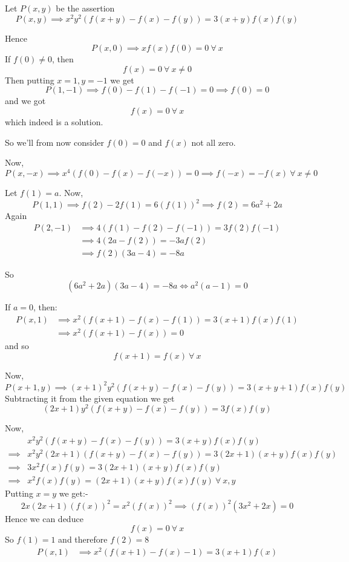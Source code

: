 \documentclass[12pt]{article}
\begin{document}
	
\Huge{Let $ P(x,y)$ be the assertion $$P(x,y)\implies x^2y^2(f(x + y)-f(x) - f(y)) = 3(x + y)f(x)f(y)$$\par
Hence$$P(x,0)\implies xf(x)f(0) = 0\ \forall\ x$$If $ f(0)\neq 0$, then $$ f(x) = 0\ \forall\ x\ne 0$$
Then putting $x=1,y=-1$ we get $$ P(1, - 1)\implies f(0)-f(1)-f(-1)=0\implies f(0) = 0$$ and we got $$ f(x) = 0\ \forall\ x$$ which indeed is a solution.\par
So we'll from now consider $ f(0) = 0$ and $ f(x)$ not all zero.\par
Now,$$ P(x, - x)\implies x^4\left( f(0)-f(x)-f(-x)\right) =0\implies f(-x)=-f(x)\ \forall\ x\ne 0$$\par
Let $ f(1) = a$. Now,$$ P(1,1) \implies f(2)-2f(1)=6\left(f(1)\right)^2\implies f(2) = 6a^2 + 2a$$
Again
\begin{align*}
P(2, - 1) & \implies 4(f(1)-f(2)-f(-1))=3f(2)f(-1)\\
&\implies 4(2a - f(2)) = - 3af(2)\\
&\implies f(2)(3a - 4) = - 8a
\end{align*}\par
So $$ (6a^2 + 2a)(3a - 4) = - 8a \iff a^2(a - 1) = 0$$\par
If $ a = 0$, then:
\begin{align*}
P(x,1) &\implies x^2(f(x + 1) - f(x)-f(1)) =3(x+1)f(x)f(1)\\
&\implies x^2(f(x+1)-f(x))=0
\end{align*}
and so $$ f(x + 1) = f(x)\ \forall\ x$$\par
Now,$$ P(x + 1,y) \implies (x + 1)^2y^2(f(x + y) - f(x) - f(y)) = 3(x + y + 1)f(x)f(y)$$
Subtracting it from the given equation we get$$(2x + 1)y^2(f(x + y) - f(x) - f(y)) = 3f(x)f(y)$$\par
Now,\begin{align*}
& x^2y^2(f(x + y)-f(x) - f(y)) = 3(x + y)f(x)f(y)\\
\implies & x^2y^2(2x+1)(f(x + y)-f(x) - f(y))=3(2x+1)(x + y)f(x)f(y)\\
\implies & 3x^2f(x)f(y)=3(2x+1)(x+y)f(x)f(y)\\
\implies & x^2f(x)f(y)=(2x+1)(x+y)f(x)f(y)\ \forall\ x,y
\end{align*}
Putting $x=y$ we get:-$$2x(2x+1)(f(x))^2=x^2(f(x))^2\implies (f(x))^2(3x^2+2x)=0$$Hence we can deduce $$ f(x) = 0\ \forall\ x$$So $ f(1) = 1$ and therefore $ f(2) = 8$
\begin{align*}
P(x,1) & \implies x^2(f(x + 1) - f(x) - 1) = 3(x + 1)f(x)\\

\end{align*}}
\end{document}
